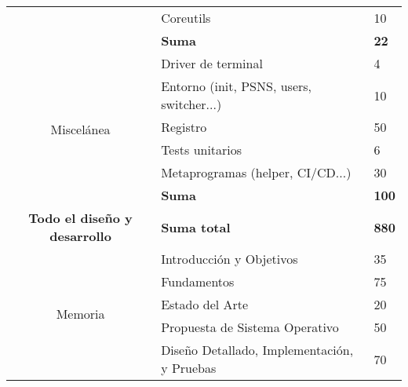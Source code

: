 \begin{table}[]
\begin{tabular}{|c|l|l|}
                                        & Coreutils                                       & 10                                            \\ \cline{2-3} 
                                        & \textbf{Suma}                                   & \textbf{22}                                   \\ \hline
\multirow{6}{*}{Miscelánea}             & Driver de terminal                              & 4                                             \\ \cline{2-3} 
                                        & Entorno (init, PSNS, users, switcher...)        & 10                                            \\ \cline{2-3} 
                                        & Registro                                        & 50                                            \\ \cline{2-3} 
                                        & Tests unitarios                                 & 6                                             \\ \cline{2-3} 
                                        & Metaprogramas (helper, CI/CD...)                & 30                                            \\ \cline{2-3} 
                                        & \textbf{Suma}                                   & \textbf{100}                                  \\ \hline
\textbf{Todo el diseño y desarrollo}    & \textbf{Suma total}                             & \textbf{880}                                  \\ \hline
\multirow{7}{*}{Memoria}                & Introducción y Objetivos                        & 35                                            \\ \cline{2-3} 
                                        & Fundamentos                                     & 75                                            \\ \cline{2-3} 
                                        & Estado del Arte                                 & 20                                            \\ \cline{2-3} 
                                        & Propuesta de Sistema Operativo                  & 50                                            \\ \cline{2-3} 
                                        & Diseño Detallado, Implementación, y Pruebas     & 70                                            \\ \cline{2-3} 

\end{tabular}
\end{table}
